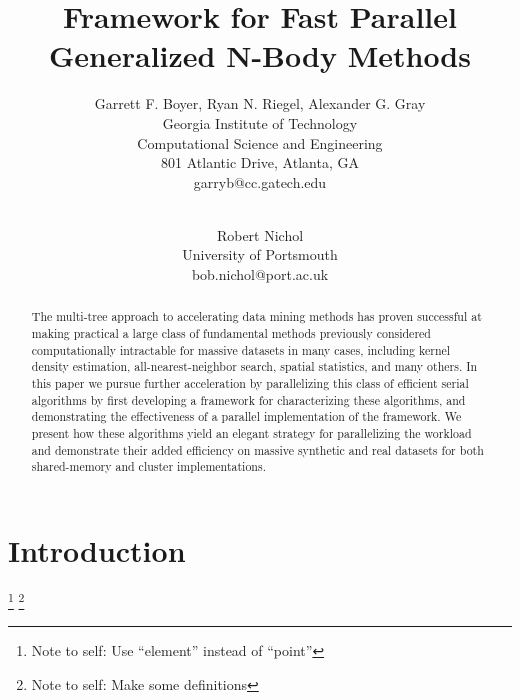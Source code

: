 \documentclass[times, leqno,twocolumn]{article}
\newcommand{\authornote}[1]{\footnote{Note to self: #1}}
\begin{document}
\title{Framework for Fast Parallel Generalized N-Body Methods}

\author{Garrett F. Boyer, Ryan N. Riegel, Alexander G. Gray
\\ Georgia Institute of Technology
\\ Computational Science and Engineering
\\ 801 Atlantic Drive, Atlanta, GA
\\ garryb@cc.gatech.edu
\\
\and
\\ Robert Nichol
\\ University of Portsmouth
\\ bob.nichol@port.ac.uk
}

\maketitle
\thispagestyle{empty}

\begin{abstract}
The multi-tree approach to accelerating data mining methods has proven successful at making practical a large class of fundamental methods previously considered computationally intractable for massive datasets in many cases, including kernel density estimation, all-nearest-neighbor search, spatial statistics, and many others.
In this paper we pursue further acceleration by parallelizing this class of efficient serial algorithms by first developing a framework for characterizing these algorithms, and demonstrating the effectiveness of a parallel implementation of the framework.
We present how these algorithms yield an elegant strategy for parallelizing the workload and demonstrate their added efficiency on massive synthetic and real datasets for both shared-memory and cluster implementations.
\end{abstract}

\section{Introduction}

\authornote{Use ``element'' instead of ``point''}
\authornote{Make some definitions}
\end{document}
